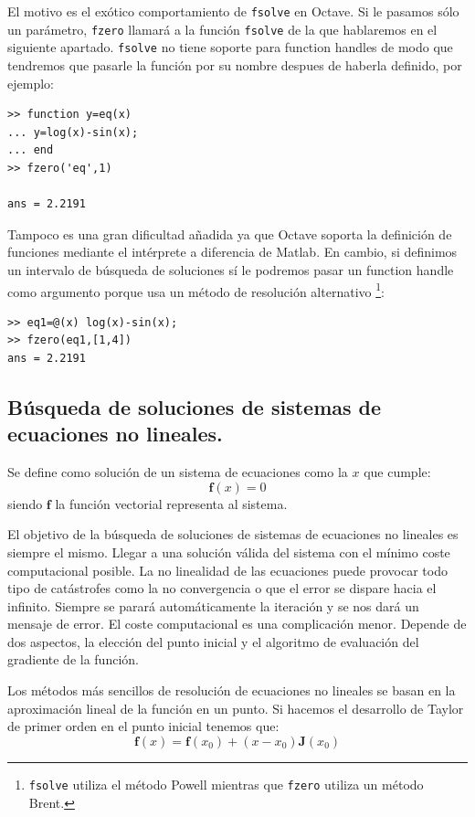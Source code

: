 El motivo es el exótico comportamiento de \texttt{fsolve} en Octave.
Si le pasamos sólo un parámetro, \texttt{fzero} llamará a la función
\texttt{fsolve} de la que hablaremos en el siguiente apartado.
\texttt{fsolve} no tiene soporte para function handles de modo que
tendremos que pasarle la función por su nombre despues de haberla
definido, por ejemplo:

  \begin{verbatim}
>> function y=eq(x)
... y=log(x)-sin(x);
... end
>> fzero('eq',1)

ans = 2.2191
\end{verbatim}
Tampoco es una gran dificultad añadida ya que Octave soporta la
definición de funciones mediante el intérprete a diferencia de Matlab.
En cambio, si definimos un intervalo de búsqueda de soluciones sí le
podremos pasar un function handle como argumento porque usa un método
de resolución alternativo%
\footnote{\texttt{fsolve} utiliza el método Powell mientras que
  \texttt{fzero} utiliza un método Brent.%
}:

  \begin{verbatim}
>> eq1=@(x) log(x)-sin(x);
>> fzero(eq1,[1,4])
ans = 2.2191 
\end{verbatim}

\subsection{Búsqueda de soluciones de sistemas de ecuaciones no
  lineales.}

Se define como solución de un sistema de ecuaciones como la $x$ que
cumple:\[ \mathbf{f}(x)=0\] siendo $\mathbf{f}$ la función vectorial
representa al sistema.

El objetivo de la búsqueda de soluciones de sistemas de ecuaciones no
lineales es siempre el mismo. Llegar a una solución válida del sistema
con el mínimo coste computacional posible. La no linealidad de las
ecuaciones puede provocar todo tipo de catástrofes como la no
convergencia o que el error se dispare hacia el infinito. Siempre se
parará automáticamente la iteración y se nos dará un mensaje de error.
El coste computacional es una complicación menor. Depende de dos
aspectos, la elección del punto inicial y el algoritmo de evaluación
del gradiente de la función.

Los métodos más sencillos de resolución de ecuaciones no lineales se
basan en la aproximación lineal de la función en un punto. Si hacemos
el desarrollo de Taylor de primer orden en el punto inicial tenemos
que:$$ \mathbf{f}(x)=\mathbf{f}(x_{0})+(x-x_{0})\mathbf{J}(x_{0})$$

